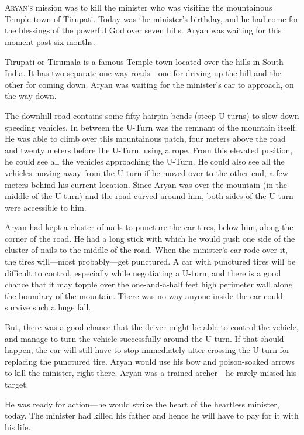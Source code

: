 
\chapter{}

\lettrine{A}{ryan's} mission was to kill the minister who was visiting the mountainous Temple
town of Tirupati. Today was the minister's birthday, and he had come for the
blessings of the powerful God over seven hills. Aryan was waiting for this
moment past six months.

Tirupati or Tirumala is a famous Temple town located over the hills in South
India. It has two separate one-way roads—one for driving up the hill
and the other for coming down. Aryan was waiting for the minister's car to
approach, on the way down.

The downhill road contains some fifty hairpin bends (steep U-turns) to slow down
speeding vehicles. In between the U-Turn was the remnant of the mountain itself.
He was able to climb over this mountainous patch, four meters above the road and
twenty meters before the U-Turn, using a rope. From this elevated position, he
could see all the vehicles approaching the U-Turn. He could also see all the
vehicles moving away from the U-turn if he moved over to the other end, a few
meters behind his current location. Since Aryan was over the mountain (in the
middle of the U-turn) and the road curved around him, both sides of the U-turn
were accessible to him.

Aryan had kept a cluster of nails to puncture the car tires, below him, along
the corner of the road. He had a long stick with which he would push one side of
the cluster of nails to the middle of the road. When the minister's car rode
over it, the tires will—most probably—get punctured. A car with punctured
tires will be difficult to control, especially while negotiating a U-turn, and
there is a good chance that it may topple over the one-and-a-half feet high
perimeter wall along the boundary of the mountain. There was no way anyone
inside the car could survive such a huge fall.

But, there was a good chance that the driver might be able to control the
vehicle, and manage to turn the vehicle successfully around the U-turn. If that
should happen, the car will still have to stop immediately after crossing the
U-turn for replacing the punctured tire. Aryan would use his bow and
poison-soaked arrows to kill the minister, right there. Aryan was a trained
archer—he rarely missed his target.

He was ready for action—he would strike the heart of the heartless minister,
today. The minister had killed his father and hence he will have to pay for it
with his life.

